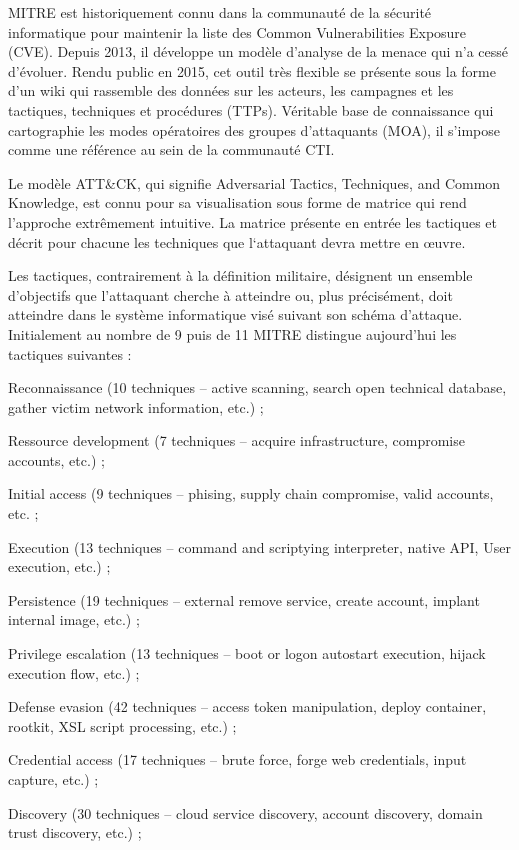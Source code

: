 MITRE est historiquement connu dans la communauté de la sécurité informatique pour maintenir la liste des Common Vulnerabilities Exposure (CVE). Depuis 2013, il développe un modèle d’analyse de la menace qui n’a cessé d’évoluer. Rendu public en 2015, cet outil très flexible se présente sous la forme d’un wiki qui rassemble des données sur les acteurs, les campagnes et les tactiques, techniques et procédures (TTPs). Véritable base de connaissance qui cartographie les modes opératoires des groupes d’attaquants (MOA), il s’impose comme une référence au sein de la communauté CTI.

Le modèle ATT&CK, qui signifie Adversarial Tactics, Techniques, and Common Knowledge, est connu pour sa visualisation sous forme de matrice qui rend l’approche extrêmement intuitive. La matrice présente en entrée les tactiques et décrit pour chacune les techniques que l‘attaquant devra mettre en œuvre. 

Les tactiques, contrairement à la définition militaire, désignent un ensemble d'objectifs que l’attaquant cherche à atteindre ou, plus précisément, doit atteindre dans le système informatique visé suivant son schéma d’attaque. Initialement au nombre de 9 puis de 11 MITRE distingue aujourd’hui les tactiques suivantes :

    Reconnaissance (10 techniques – active scanning, search open technical database, gather victim network information, etc.) ;

    Ressource development (7 techniques – acquire infrastructure, compromise accounts, etc.) ;

    Initial access (9 techniques – phising, supply chain compromise, valid accounts, etc. ;

    Execution (13 techniques – command and scriptying interpreter, native API, User execution, etc.) ;

    Persistence (19 techniques – external remove service, create account, implant internal image, etc.) ;

    Privilege escalation (13 techniques – boot or logon autostart execution, hijack execution flow, etc.) ;

    Defense evasion (42 techniques – access token manipulation, deploy container, rootkit, XSL script processing, etc.) ;

    Credential access (17 techniques – brute force, forge web credentials, input capture, etc.) ;

    Discovery (30 techniques – cloud service discovery, account discovery, domain trust discovery, etc.) ;

